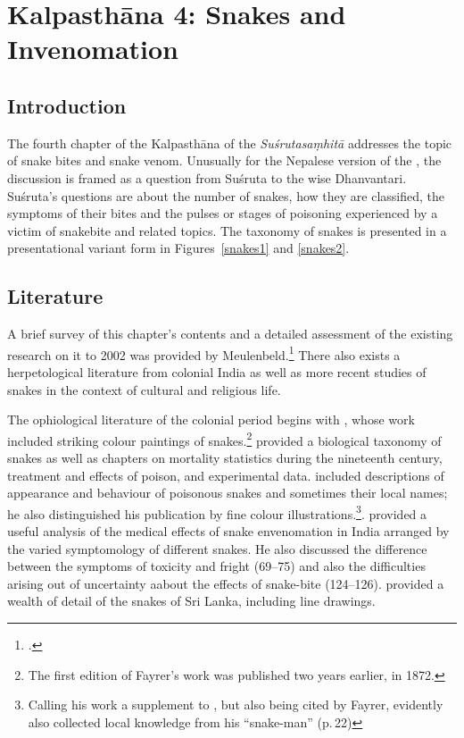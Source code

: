 \chapter{Kalpasthāna 4: Snakes and Invenomation}

\section{Introduction} 

The fourth chapter of the Kalpasthāna of the
\emph{Suśrutasaṃhitā} addresses the topic of snake bites and snake venom. 
Unusually for the Nepalese version of the \SS, the discussion is framed as a
question from Suśruta to the wise Dhanvantari.  Suśruta's questions are
about the number of snakes, how they are classified, the symptoms of their
bites and the pulses or stages of poisoning experienced by a victim of
snakebite and related topics.  The taxonomy of snakes is presented in a
presentational variant form in Figures~\ref{snakes1} and \ref{snakes2}.

\section{Literature} 

A brief survey of this chapter's contents and a detailed assessment of the
existing research on it to 2002 was provided by Meulenbeld.\footcite[IA,
292--294]{meul-hist} There also exists a herpetological literature from
colonial India as well as more recent studies of snakes in the context of
cultural and religious life. 

The ophiological literature of the colonial period begins with
\citet{fayr-1874}, whose work included striking colour paintings of
snakes.\footnote{The first edition of Fayrer's work was published two years
    earlier, in 1872.} \citeauthor{fayr-1874} provided a biological taxonomy of
    snakes as well as chapters on mortality statistics during the nineteenth
    century, treatment and effects of poison, and experimental data.
    \citet{ewar-1878} included descriptions of appearance and behaviour of
    poisonous snakes and sometimes their local names; he also distinguished his
    publication by fine colour illustrations.\footnote{Calling his work a
        supplement to \citet{fayr-1874}, but also being cited by Fayrer,
        \cite{ewar-1878} evidently also collected local knowledge from his
        “snake-man” (p.\,22)}. \citet[75--124]{wall-1913} provided a useful analysis
        of the medical effects of snake envenomation in India arranged by the varied
        symptomology of different snakes.  He also discussed the difference between
        the symptoms of toxicity and fright (69--75) and also the difficulties
        arising out of uncertainty aabout the effects of snake-bite (124--126).
        \citet{wall-1921} provided a wealth of detail of the snakes of Sri Lanka,
        including line drawings. 
        
